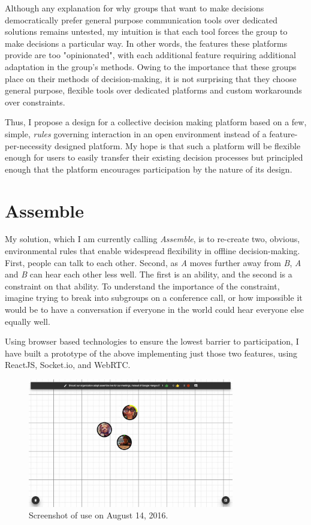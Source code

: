 \documentclass{article}
\begin{document}
\medskip

Although any explanation for why groups that want to make decisions democratically prefer
general purpose communication tools over dedicated solutions remains untested, my intuition
is that each tool forces the group to make decisions a particular way. In other words,
the features these platforms provide are too "opinionated", with each additional feature
requiring additional adaptation in the group's methods. Owing to
the importance that these groups place on their methods of decision-making, it is
not surprising that they choose general purpose, flexible tools over dedicated platforms
and custom workarounds over constraints.

\medskip

Thus, I propose a design for a collective decision making platform based on a few,
simple, \textit{rules} governing interaction in an open environment instead of a
feature-per-necessity designed platform. My hope is that such a platform will be
flexible enough for users to easily transfer their existing decision processes
but principled enough that the platform encourages participation by the nature of its
design.

\section{Assemble}

My solution, which I am currently calling \textit{Assemble}, is to re-create
two, obvious, environmental rules that enable widespread flexibility in offline decision-making.
First, people can talk to each other. Second, as \textit{A} moves further away from
\textit{B}, \textit{A} and \textit{B} can hear each other less well. The first is an
ability, and the second is a constraint on that ability. To understand the importance
of the constraint, imagine trying to break into subgroups on a conference call,
or how impossible it would be to have a conversation if everyone in the world could
hear everyone else equally well.

\medskip

Using browser based technologies to ensure the lowest barrier to participation, I have
built a prototype of the above implementing just those two features, using ReactJS,
Socket.io, and WebRTC.


\begin{figure}[ht!]
\centering
\includegraphics[width=90mm]{./papers/proposal/screenshot.jpg}
\caption{Screenshot of use on August 14, 2016.}
\end{figure}
\end{document}

